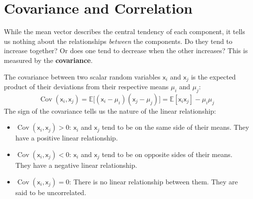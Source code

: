 \section{Covariance and Correlation}
While the mean vector describes the central tendency of each component, it tells us nothing about the relationships \textit{between} the components. Do they tend to increase together? Or does one tend to decrease when the other increases? This is measured by the \textbf{covariance}.

The covariance between two scalar random variables $\mathsf{x}_i$ and $\mathsf{x}_j$ is the expected product of their deviations from their respective means $\mu_i$ and $\mu_j$:
\begin{equation}
    \operatorname{Cov}(\mathsf{x}_i, \mathsf{x}_j) = \mathbb{E}\big[(\mathsf{x}_i - \mu_i)(\mathsf{x}_j - \mu_j)\big] = \mathbb{E}[\mathsf{x}_i \mathsf{x}_j] - \mu_i \mu_j
\end{equation}
The sign of the covariance tells us the nature of the linear relationship:
\begin{itemize}
    \item $\operatorname{Cov}(\mathsf{x}_i, \mathsf{x}_j) > 0$: $\mathsf{x}_i$ and $\mathsf{x}_j$ tend to be on the same side of their means. They have a positive linear relationship.
    \item $\operatorname{Cov}(\mathsf{x}_i, \mathsf{x}_j) < 0$: $\mathsf{x}_i$ and $\mathsf{x}_j$ tend to be on opposite sides of their means. They have a negative linear relationship.
    \item $\operatorname{Cov}(\mathsf{x}_i, \mathsf{x}_j) = 0$: There is no linear relationship between them. They are said to be uncorrelated.
\end{itemize}


